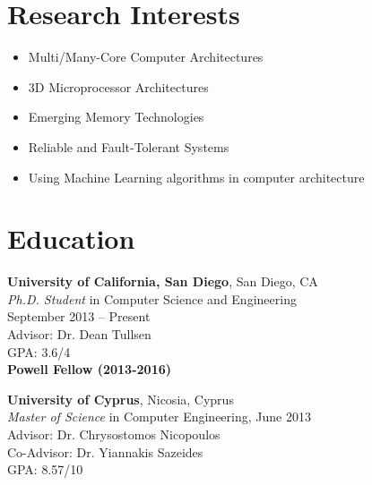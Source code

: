 \documentclass[11pt]{myres} %
\begin{document}
 
\onehalfspacing


\address{
		  \emph{10545 Ponder Way} \\ 
		  \emph{San Diego, CA, 92126}}
		  
\address{
		  \href{mailto:prodromou.andreas@gmail.com} 								   {\underline{prodromou.andreas@gmail.com}} \\  
		  \emph{tel: (858) 263-5813}}
             
                             
\begin{resume}
                                
\singlespacing

\section{Research Interests}
	\begin{itemize}
		\item Multi/Many-Core Computer Architectures
		\item 3D Microprocessor Architectures
		\item Emerging Memory Technologies
		\item Reliable and Fault-Tolerant Systems
		\item Using Machine Learning algorithms in computer architecture
	\end{itemize}
 
\section{Education} 
\noindent 
	{\color{blue}\textbf{University of California, San Diego}, San Diego, CA} \\
	\emph{Ph.D. Student} in Computer Science and Engineering \\
	September 2013 -- Present \\
	Advisor: Dr. Dean Tullsen \\
	GPA: 3.6/4 \\
	\textbf{Powell Fellow (2013-2016)}

	{\color{blue}\textbf{University of Cyprus}, Nicosia, Cyprus} \\
	\emph{Master of Science} in Computer Engineering, June 2013 \\
	Advisor: Dr. Chrysostomos Nicopoulos \\
	Co-Advisor: Dr. Yiannakis Sazeides \\
	GPA: 8.57/10
	

\end{resume}
\end{document}
